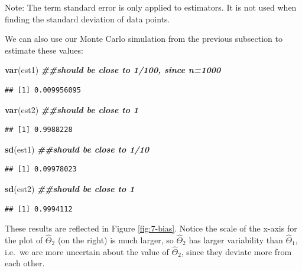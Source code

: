 \documentclass[
]{book}
\newenvironment{Shaded}{\begin{snugshade}}{\end{snugshade}}
\newcommand{\DocumentationTok}[1]{\textcolor[rgb]{0.56,0.35,0.01}{\textbf{\textit{#1}}}}
\newcommand{\FunctionTok}[1]{\textcolor[rgb]{0.13,0.29,0.53}{\textbf{#1}}}
\newcommand{\NormalTok}[1]{#1}
\begin{document}
Note: The term standard error is only applied to estimators. It is not used when finding the standard deviation of data points.

We can also use our Monte Carlo simulation from the previous subsection to estimate these values:

\begin{Shaded}
\begin{Highlighting}[]
\FunctionTok{var}\NormalTok{(est1) }\DocumentationTok{\#\#should be close to 1/100, since n=1000}
\end{Highlighting}
\end{Shaded}

\begin{verbatim}
## [1] 0.009956095
\end{verbatim}

\begin{Shaded}
\begin{Highlighting}[]
\FunctionTok{var}\NormalTok{(est2) }\DocumentationTok{\#\#should be close to 1}
\end{Highlighting}
\end{Shaded}

\begin{verbatim}
## [1] 0.9988228
\end{verbatim}

\begin{Shaded}
\begin{Highlighting}[]
\FunctionTok{sd}\NormalTok{(est1) }\DocumentationTok{\#\#should be close to 1/10}
\end{Highlighting}
\end{Shaded}

\begin{verbatim}
## [1] 0.09978023
\end{verbatim}

\begin{Shaded}
\begin{Highlighting}[]
\FunctionTok{sd}\NormalTok{(est2) }\DocumentationTok{\#\#should be close to 1}
\end{Highlighting}
\end{Shaded}

\begin{verbatim}
## [1] 0.9994112
\end{verbatim}

These results are reflected in Figure \ref{fig:7-bias}. Notice the scale of the x-axis for the plot of \(\hat{\Theta}_2\) (on the right) is much larger, so \(\hat{\Theta}_2\) has larger variability than \(\hat{\Theta}_1\), i.e.~we are more uncertain about the value of \(\hat{\Theta}_2\), since they deviate more from each other.
\end{document}
